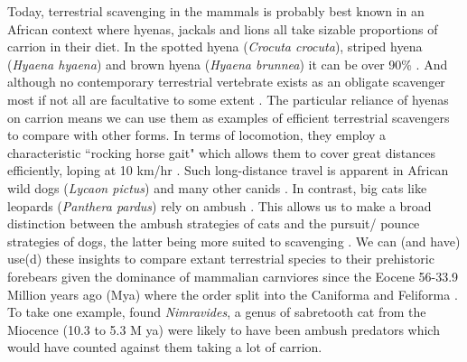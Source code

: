 \documentclass[a4paper,12pt]{article}
\begin{document}
Today, terrestrial scavenging in the mammals is probably best known in an African context where hyenas, jackals and lions all take sizable proportions of carrion in their diet.
In the spotted hyena (\textit{Crocuta crocuta}), striped hyena (\textit{Hyaena hyaena}) and brown hyena (\textit{Hyaena brunnea}) it can be over 90\% \citep{jones2015african}.
And although no contemporary terrestrial vertebrate exists as an obligate scavenger most if not all are facultative to some extent \citep{beasley2015vertebrates}.
The particular reliance of hyenas on carrion means we can use them as examples of efficient terrestrial scavengers to compare with other forms. 
In terms of locomotion, they employ a characteristic ``rocking horse gait"  which allows them to cover great distances efficiently, loping at 10 km/hr \citep{mills1989comparative,jones2015african}. 
Such long-distance travel is apparent in African wild dogs (\textit{Lycaon pictus}) and many other canids \citep{pennycuick1995radius,janis2014forelimb}. 
In contrast, big cats like leopards (\textit{Panthera pardus}) rely on ambush \citep{pennycuick1995radius}. 
This allows us to make a broad distinction between the ambush strategies of cats and the pursuit/ pounce strategies of dogs, the latter being more suited to scavenging \citep{janis2014forelimb}. 
We can (and have) use(d) these insights to compare extant terrestrial species to their prehistoric forebears given the dominance of mammalian carnviores since the Eocene 56-33.9 Million years ago (Mya) where the order split into the Caniforma and Feliforma \citep{van1987skeletal}.
To take one example, \cite{anyonge1996locomotor} found \textit{Nimravides}, a genus of sabretooth cat from the Miocence (10.3 to 5.3 M ya) were likely to have been ambush predators which would have counted against them taking a lot of carrion.  
\end{document}
